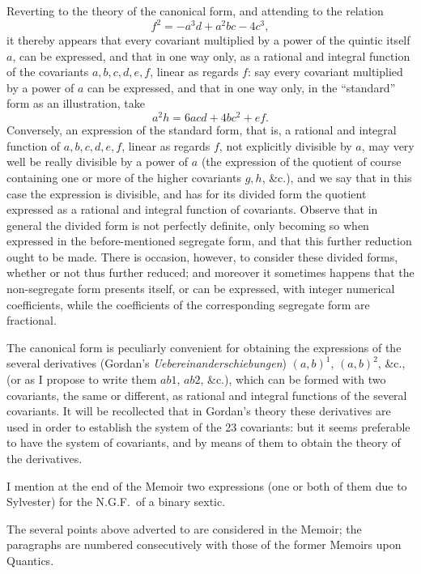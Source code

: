 \documentclass[11pt]{article}
\begin{document}
Reverting to the theory of the canonical form, and attending to the relation
\[
f^{2} = -a^{3}d + a^{2}bc - 4c^{3},
\]
it thereby appears that every covariant multiplied by a power of the quintic itself $a$, can be expressed, and that in one way only, as a rational and integral function of the covariants $a, b, c, d, e, f$, linear as regards $f$: say every covariant multiplied by a power of $a$ can be expressed, and that in one way only, in the ``standard'' form as an illustration, take
\[
a^{2}h = 6acd + 4bc^{2} + ef.
\]
Conversely, an expression of the standard form, that is, a rational and integral function of $a, b, c, d, e, f$, linear as regards $f$, not explicitly divisible by $a$, may very well be really divisible by a power of $a$ (the expression of the quotient of course containing one or more of the higher covariants $g, h$, \&c.), and we say that in this case the expression is divisible, and has for its divided form the quotient expressed as a rational and integral function of covariants. Observe that in general the divided form is not perfectly definite, only becoming so when expressed in the before-mentioned segregate form, and that this further reduction ought to be made. There is occasion, however, to consider these divided forms, whether or not thus further reduced; and moreover it sometimes happens that the non-segregate form presents itself, or can be expressed, with integer numerical coefficients, while the coefficients of the corresponding segregate form are fractional.

The canonical form is peculiarly convenient for obtaining the expressions of the several derivatives (Gordan's \textit{Uebereinanderschiebungen}) $(a, b)^{1}$, $(a, b)^{2}$, \&c., (or as I propose to write them $ab1$, $ab2$, \&c.), which can be formed with two covariants, the same or different, as rational and integral functions of the several covariants. It will be recollected that in Gordan's theory these derivatives are used in order to establish the system of the 23 covariants: but it seems preferable to have the system of covariants, and by means of them to obtain the theory of the derivatives.

I mention at the end of the Memoir two expressions (one or both of them due to Sylvester) for the N.G.F.\ of a binary sextic.

The several points above adverted to are considered in the Memoir; the paragraphs are numbered consecutively with those of the former Memoirs upon Quantics.

\end{document}
